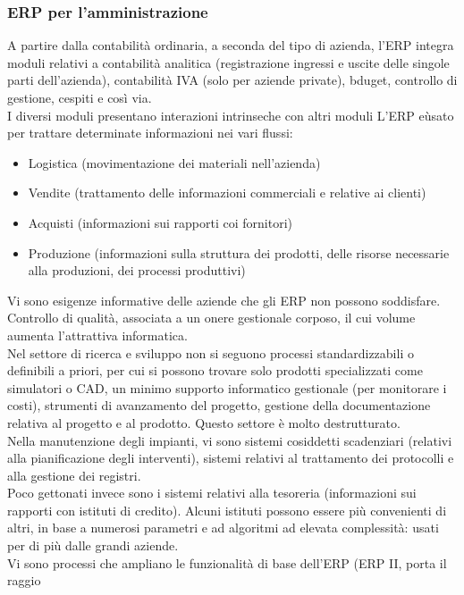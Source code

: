 \subsubsection{ERP per l'amministrazione}
\label{subs:ERP per l'amministrazione}
A partire dalla contabilit\`a ordinaria, a seconda del tipo di azienda, l'ERP integra moduli
relativi a contabilit\`a analitica (registrazione ingressi e uscite delle singole parti dell'azienda),
contabilit\`a IVA (solo per aziende private), bduget, controllo di gestione, cespiti e cos\`i via.\\
I diversi moduli presentano interazioni intrinseche con altri moduli
L'ERP e\`usato per trattare determinate informazioni nei vari flussi:
\begin{itemize}
  \item Logistica (movimentazione dei materiali nell'azienda)
  \item Vendite (trattamento delle informazioni commerciali e relative ai clienti)
  \item Acquisti (informazioni sui rapporti coi fornitori)
  \item Produzione (informazioni sulla struttura dei prodotti, delle risorse necessarie
  alla produzioni, dei processi produttivi)
\end{itemize}
Vi sono esigenze informative delle aziende che gli ERP non possono soddisfare.\\
Controllo di qualit\`a, associata a un onere gestionale corposo, il cui volume aumenta
l'attrattiva informatica.\\
Nel settore di ricerca e sviluppo non si seguono processi standardizzabili o definibili
a priori, per cui si possono trovare solo prodotti specializzati come simulatori o CAD,
un minimo supporto informatico gestionale (per monitorare i costi), strumenti di avanzamento
del progetto, gestione della documentazione relativa al progetto e al prodotto. Questo settore
\`e molto destrutturato.\\
Nella manutenzione degli impianti, vi sono sistemi cosiddetti scadenziari (relativi alla pianificazione
degli interventi), sistemi relativi al trattamento dei protocolli e alla gestione dei registri.\\
Poco gettonati invece sono i sistemi relativi alla tesoreria (informazioni
sui rapporti con istituti di credito). Alcuni istituti possono essere pi\`u convenienti di altri,
in base a numerosi parametri e ad algoritmi ad elevata complessit\`a: usati per di pi\`u dalle grandi aziende.\\
Vi sono processi che ampliano le funzionalit\`a di base dell'ERP (ERP II, porta il raggio
